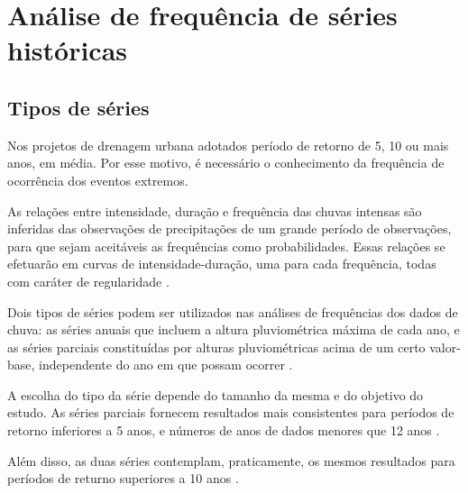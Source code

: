 \section{Análise de frequência de séries históricas}

\subsection{Tipos de séries}

Nos projetos de drenagem urbana adotados período de retorno de 5, 10 ou mais anos, em média. Por esse motivo, é necessário o conhecimento da frequência de ocorrência dos eventos extremos.

As relações entre intensidade, duração e frequência das chuvas intensas são inferidas das observações de precipitações de um grande período de observações, para que sejam aceitáveis as frequências como probabilidades. Essas relações se efetuarão em curvas de intensidade-duração, uma para cada frequência, todas com caráter de regularidade \cite{drenagem-superficial}.

Dois tipos de séries podem ser utilizados nas análises de frequências dos dados de chuva: as séries anuais que incluem a altura pluviométrica máxima de cada ano, e as séries parciais constituídas por alturas pluviométricas acima de um certo valor-base, independente do ano em que possam ocorrer \cite{drenagem-superficial}.

A escolha do tipo da série depende do tamanho da mesma e do objetivo do estudo. As séries parciais fornecem resultados mais consistentes para períodos de retorno inferiores a 5 anos, e números de anos de dados menores que 12 anos \cite{tucci1993}.

Além disso, as duas séries contemplam, praticamente, os mesmos resultados para períodos de returno superiores a 10 anos \cite{manual-daee}.